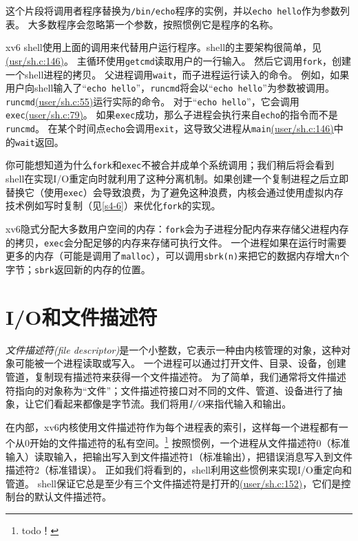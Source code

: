 这个片段将调用者程序替换为\texttt{/bin/echo}程序的实例，并以\texttt{echo hello}作为参数列表。
大多数程序会忽略第一个参数，按照惯例它是程序的名称。

xv6 shell使用上面的调用来代替用户运行程序。shell的主要架构很简单，见\href{https://github.com/mit-pdos/xv6-riscv/blob/riscv//user/sh.c#L146}{(usr/sh.c:146)}。
主循环使用\texttt{getcmd}读取用户的一行输入。
然后它调用\texttt{fork}，创建一个shell进程的拷贝。
父进程调用\texttt{wait}，而子进程运行读入的命令。
例如，如果用户向shell输入了“\texttt{echo hello}”，\texttt{runcmd}将会以“\texttt{echo hello}”为参数被调用。
\texttt{runcmd}\href{https://github.com/mit-pdos/xv6-riscv/blob/riscv//user/sh.c#L55}{(user/sh.c:55)}运行实际的命令。
对于“\texttt{echo hello}”，它会调用\texttt{exec}\href{https://github.com/mit-pdos/xv6-riscv/blob/riscv//user/sh.c#L79}{(user/sh.c:79)}。
如果\texttt{exec}成功，那么子进程会执行来自\texttt{echo}的指令而不是\texttt{runcmd}。
在某个时间点\texttt{echo}会调用\texttt{exit}，这导致父进程从\texttt{main}\href{https://github.com/mit-pdos/xv6-riscv/blob/riscv//user/sh.c#L146}{(user/sh.c:146)}中的\texttt{wait}返回。

你可能想知道为什么\texttt{fork}和\texttt{exec}不被合并成单个系统调用；我们稍后将会看到shell在实现I/O重定向时就利用了这种分离机制。如果创建一个复制进程之后立即替换它（使用\texttt{exec}）会导致浪费，为了避免这种浪费，内核会通过使用虚拟内存技术例如写时复制（见\autoref{s4-6}）来优化\texttt{fork}的实现。

xv6隐式分配大多数用户空间的内存：\texttt{fork}会为子进程分配内存来存储父进程内存的拷贝，\texttt{exec}会分配足够的内存来存储可执行文件。
一个进程如果在运行时需要更多的内存（可能是调用了\texttt{malloc}），可以调用\texttt{sbrk(n)}来把它的数据内存增大\texttt{n}个字节；\texttt{sbrk}返回新的内存的位置。

\section{I/O和文件描述符}

\emph{文件描述符(file descriptor)}是一个小整数，它表示一种由内核管理的对象，这种对象可能被一个进程读取或写入。
一个进程可以通过打开文件、目录、设备，创建管道，复制现有描述符来获得一个文件描述符。
为了简单，我们通常将文件描述符指向的对象称为“文件”；文件描述符接口对不同的文件、管道、设备进行了抽象，让它们看起来都像是字节流。我们将用\emph{I/O}来指代输入和输出。

在内部，xv6内核使用文件描述符作为每个进程表的索引，这样每一个进程都有一个从0开始的文件描述符的私有空间。\footnote{todo！}
按照惯例，一个进程从文件描述符0（标准输入）读取输入，把输出写入到文件描述符1（标准输出），把错误消息写入到文件描述符2（标准错误）。
正如我们将看到的，shell利用这些惯例来实现I/O重定向和管道。
shell保证它总是至少有三个文件描述符是打开的\href{https://github.com/mit-pdos/xv6-riscv/blob/riscv//user/sh.c#L152}{(user/sh.c:152)}，它们是控制台的默认文件描述符。

